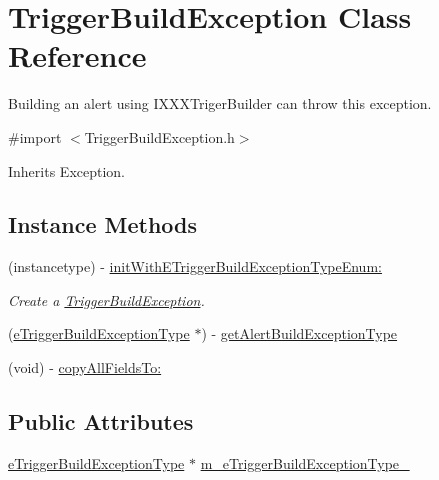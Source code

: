 \hypertarget{interface_trigger_build_exception}{}\section{Trigger\+Build\+Exception Class Reference}
\label{interface_trigger_build_exception}


Building an alert using I\+X\+X\+X\+Triger\+Builder can throw this exception.  




{\ttfamily \#import $<$Trigger\+Build\+Exception.\+h$>$}



Inherits Exception.

\subsection*{Instance Methods}
\begin{DoxyCompactItemize}
\item 
(instancetype) -\/ \hyperlink{interface_trigger_build_exception_a50a7fb1ea5b252bdd33de268d3a0636b}{init\+With\+E\+Trigger\+Build\+Exception\+Type\+Enum\+:}
\begin{DoxyCompactList}\small\item\em Create a \hyperlink{interface_trigger_build_exception}{Trigger\+Build\+Exception}. \end{DoxyCompactList}\item 
(\hyperlink{interfacee_trigger_build_exception_type}{e\+Trigger\+Build\+Exception\+Type} $\ast$) -\/ \hyperlink{interface_trigger_build_exception_a444f1dad052c069d39911326535c7485}{get\+Alert\+Build\+Exception\+Type}
\item 
(void) -\/ \hyperlink{interface_trigger_build_exception_a87fb88b953e3c76467cf09ddcd9cd4d4}{copy\+All\+Fields\+To\+:}
\end{DoxyCompactItemize}
\subsection*{Public Attributes}
\begin{DoxyCompactItemize}
\item 
\hyperlink{interfacee_trigger_build_exception_type}{e\+Trigger\+Build\+Exception\+Type} $\ast$ \hyperlink{interface_trigger_build_exception_a09685325ae67d1b5c6be5da1b06c8348}{m\+\_\+e\+Trigger\+Build\+Exception\+Type\+\_\+}
\end{DoxyCompactItemize}



